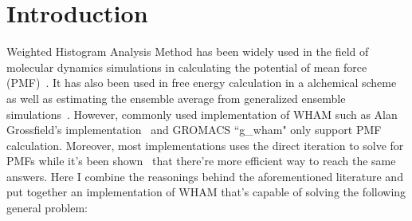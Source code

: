 \section{Introduction}

Weighted Histogram Analysis Method has been widely used in the field of 
molecular dynamics simulations in calculating the potential of mean force
(PMF)~\cite{Kumar1992,Roux1995275}.
It has also been used in free energy calculation in a alchemical scheme~\cite{Kumar1992} as 
well as estimating the ensemble average from generalized ensemble simulations~\cite{Chodera2007}.
However, commonly used implementation of WHAM such as Alan Grossfield's 
implementation~\cite{wham205} and GROMACS ``g\_wham" only support PMF calculation.
Moreover, most implementations uses the direct iteration to solve for PMFs 
while it's been shown~\cite{Zhu2012} that there're more efficient way to 
reach the same answers. Here I combine the reasonings behind the aforementioned
literature and put together an implementation of WHAM that's capable of solving 
the following general problem:


